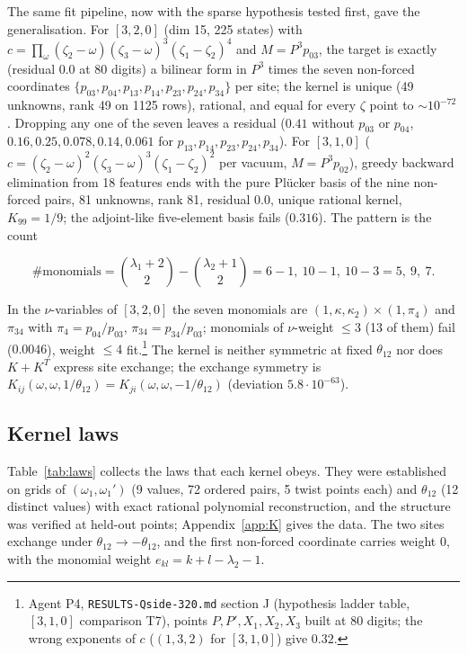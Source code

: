 \documentclass[11pt]{article}
\begin{document}
The same fit pipeline, now with the sparse hypothesis tested first, gave the generalisation.
For $[3,2,0]$ (dim 15, 225 states) with $c=\prod_\omega(\zeta_2-\omega)(\zeta_3-\omega)^3(\zeta_1-\zeta_2)^4$ and $M=P^3p_{03}$, the target is exactly (residual $0.0$ at 80 digits) a bilinear form in $P^3$ times the seven non-forced coordinates $\{p_{03},p_{04},p_{13},p_{14},p_{23},p_{24},p_{34}\}$ per site; the kernel is unique (49 unknowns, rank 49 on 1125 rows), rational, and equal for every $\zeta$ point to $\sim10^{-72}$. Dropping any one of the seven leaves a residual ($0.41$ without $p_{03}$ or $p_{04}$, $0.16,0.25,0.078,0.14,0.061$ for $p_{13},p_{14},p_{23},p_{24},p_{34}$).
For $[3,1,0]$ ($c=(\zeta_2-\omega)^2(\zeta_3-\omega)^3(\zeta_1-\zeta_2)^2$ per vacuum, $M=P^3p_{02}$), greedy backward elimination from 18 features ends with the pure Plücker basis of the nine non-forced pairs, 81 unknowns, rank 81, residual $0.0$, unique rational kernel, $K_{99}=1/9$; the adjoint-like five-element basis fails ($0.316$).
The pattern is the count

\begin{equation}
\#\text{monomials}=\binom{\lambda_1+2}2-\binom{\lambda_2+1}2=6-1,\ 10-1,\ 10-3=5,\ 9,\ 7.\label{eq:count}
\end{equation}

In the $\nu$-variables of $[3,2,0]$ the seven monomials are $(1,\kappa,\kappa_2)\times(1,\pi_4)$ and $\pi_{34}$ with $\pi_4=p_{04}/p_{03}$, $\pi_{34}=p_{34}/p_{03}$; monomials of $\nu$-weight $\le3$ (13 of them) fail ($0.0046$), weight $\le4$ fit.\footnote{Agent P4, \texttt{RESULTS-\allowbreak{}Qside-\allowbreak{}320.\allowbreak{}md} section J (hypothesis ladder table, $[3,1,0]$ comparison T7), points $P,P',X_1,X_2,X_3$ built at 80 digits; the wrong exponents of $c$ ($(1,3,2)$ for $[3,1,0]$) give $0.32$.} The kernel is neither symmetric at fixed $\theta_{12}$ nor does $K+K^T$ express site exchange; the exchange symmetry is $K_{ij}(\omega,\omega,1/\theta_{12})=K_{ji}(\omega,\omega,-1/\theta_{12})$ (deviation $5.8\cdot10^{-63}$).

\subsection{Kernel laws}\label{sec:laws}

Table~\ref{tab:laws} collects the laws that each kernel obeys.
They were established on grids of $(\omega_1,\omega_1')$ (9 values, 72 ordered pairs, 5 twist points each) and $\theta_{12}$ (12 distinct values) with exact rational polynomial reconstruction, and the structure was verified at held-out points; Appendix~\ref{app:K} gives the data.
The two sites exchange under $\theta_{12}\to-\theta_{12}$, and the first non-forced coordinate carries weight $0$, with the monomial weight $e_{kl}=k+l-\lambda_2-1$.
\end{document}
